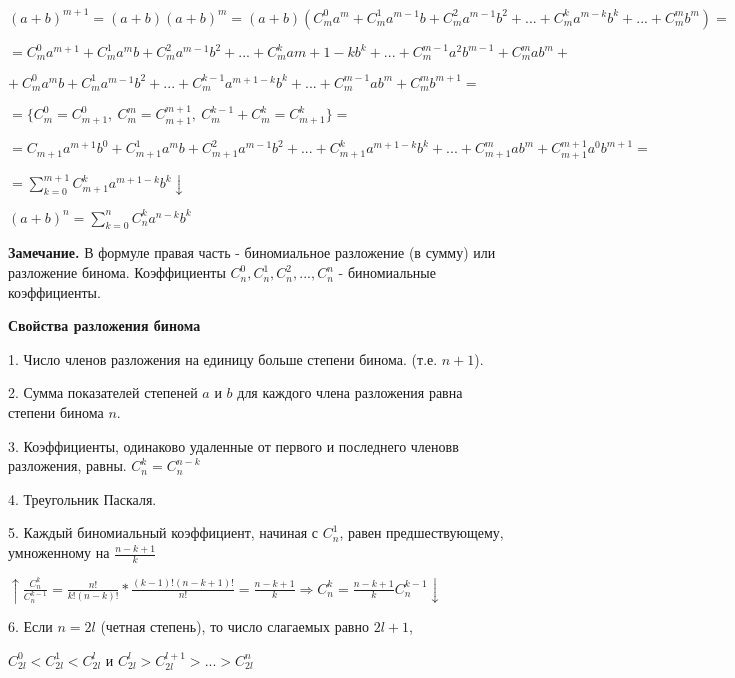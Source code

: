 \documentclass{article}
\begin{document}
    \begin{center}
        \((a + b)^{m+1} = (a + b)(a + b)^m = (a + b)(C_m^0 a^m + C_m^1 a^{m-1} b + C_m^2 a^{m-1} b^2 + ... + C_m^k a^{m-k} b^k + ... + C_m^m b^m) =\)
    
        \(= C_m^0 a^{m+1} + \boxed{C_m^1} a^m b + C_m^2 a^{m-1} b^2 + ... + C_m^k a{m+1-k} b^k + ... + C_m^{m-1} a^2 b^{m-1} + C_m^m ab^m +\)
        
        \(+\ \boxed{C_m^0} a^m b + C_m^1 a^{m-1} b^2 + ... + C_m^{k-1} a^{m+1-k} b^k + ... + C_m^{m-1} ab^m + C_m^m b^{m+1} =\)
        
        \(= \{C_m^0 = C_{m+1}^0,\ C_m^m = C_{m+1}^{m+1},\ C_m^{k-1} + C_m^k = C_{m+1}^k\} =\)
    
        \(= C_{m+1} a^{m+1} b^0 + C_{m+1}^1 a^m b + C_{m+1}^2 a^{m-1} b^2 + ... + C_{m+1}^k a^{m+1-k} b^k + ... + C_{m+1}^m ab^m + C_{m+1}^{m+1} a^0 b^{m+1} =\)
    
        \(= \sum\limits_{k=0}^{m+1} C_{m+1}^k a^{m+1-k} b^k \downarrow\)

        \((a + b)^n = \sum\limits_{k=0}^n C_n^k a^{n-k} b^k\)
    \end{center}

    \textbf{Замечание.} В формуле правая часть - биномиальное разложение (в сумму) или разложение бинома. 
    Коэффициенты \(C_n^0, C_n^1, C_n^2, ..., C_n^n\) - биномиальные коэффициенты.

    \textbf{Свойства разложения бинома}

    1. Число членов разложения на единицу больше степени бинома. (т.е. \(n + 1\)).

    2. Сумма показателей степеней \(a\) и \(b\) для каждого члена разложения равна степени бинома \(n\).

    3. Коэффициенты, одинаково удаленные от первого и последнего членовв разложения, равны. \(C_n^k = C_n^{n-k}\)

    4. Треугольник Паскаля.

    5. Каждый биномиальный коэффициент, начиная с \(C_n^1\), равен предшествующему, умноженному на \(\frac{n - k + 1}{k}\)

    \(\uparrow \frac{C_n^k}{C_n^{k-1}} = \frac{n!}{k!(n - k)!} * \frac{(k - 1)!(n - k + 1)!}{n!} = \frac{n - k + 1}{k} \Rightarrow C_n^k = \frac{n - k + 1}{k} C_n^{k-1} \downarrow\)

    6. Если \(n = 2l\) (четная степень), то число слагаемых равно \(2l + 1\),

    \begin{center}
        \(C_{2l}^0 < C_{2l}^1 < C_{2l}^l\) и \(C_{2l}^l > C_{2l}^{l+1} > ... > C_{2l}^n\)
    \end{center}
\end{document}
